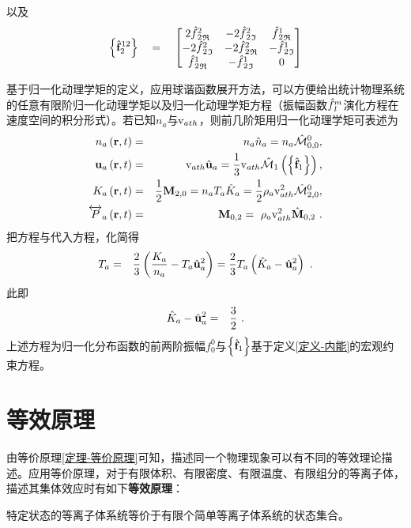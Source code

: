   以及
  \begin{equation}
      \left \{\hat{\mathbf{f}}_2^{12} \right \} \quad = \quad 
      \begin{bmatrix}
      2 {{\hat{f}}{_2^2}}_{\mathfrak{R}} & -2 {{\hat{f}}{_2^2}}_{\mathfrak{I}} & {{\hat{f}}{_2^1}}_{\mathfrak{R}} \\
      -2 {{\hat{f}}{_2^2}}_{\mathfrak{I}} & -2 {{\hat{f}}{_2^2}}_{\mathfrak{R}} & -{{\hat{f}}{_2^1}}_{\mathfrak{I}} \\
      {{\hat{f}}{_2^1}}_{\mathfrak{R}} & -{{\hat{f}}{_2^1}}_{\mathfrak{I}} & 0 \\
      \end{bmatrix} \label{fh212}
  \end{equation}
  
  基于归一化动理学矩的定义，应用球谐函数展开方法，可以方便给出统计物理系统的任意有限阶归一化动理学矩以及归一化动理学矩方程（振幅函数$\hat{f}{_{l}^m}$演化方程在速度空间的积分形式）。若已知$n_a$与$\mathrm{v}_{ath}$，则前几阶矩用归一化动理学矩可表述为
  \begin{eqnarray}
      n_a \left(\mathbf{r},t \right) &=& n_a \hat{n}_a = n_a \hat{\mathcal{M}}_{0,0}^0 ,  \label{naMh} 
      \\
      \mathbf{u}_a \left(\mathbf{r},t \right) &=& \mathrm{v}_{ath} \hat{\mathbf{u}}_a = \frac{1}{3}\mathrm{v}_{ath} \hat{\mathcal{M}}_1 \left(\left \{\hat{\mathbf{f}}_1 \right \} \right) ,  \label{uaMh} 
      \\
      K_a \left(\mathbf{r},t \right) &=& \frac{1}{2} \mathbf{M}_{2,0} = n_a T_a \hat{K}_a = \frac{1}{2} \rho_a \mathrm{v}_{ath}^2 \hat{\mathcal{M}}_{2,0}^0, \label{KaMh}
      \\
      \overleftrightarrow{P}_a \left(\mathbf{r},t \right) &=& \ \mathbf{M}_{0,2} =  \  \rho_a \mathrm{v}_{ath}^2 \hat{\mathbf{M}}_{0,2} ~. \label{PaIh}
  \end{eqnarray}
  把方程与代入方程，化简得
  \begin{eqnarray}
      T_a &=& \frac{2}{3} \left(\frac{K_a}{n_a} - T_a \hat{\mathbf{u}}_a^2 \right) = \frac{2}{3} T_a  \left(\hat{K}_a - \hat{\mathbf{u}}_a^2 \right)  ~. \label{TaMh}
  \end{eqnarray}
  此即
  \begin{eqnarray}
      \hat{K}_a - \hat{\mathbf{u}}_a^2  &=&  \frac{3}{2} ~. \label{Khauha}
  \end{eqnarray}
  上述方程为归一化分布函数的前两阶振幅$ f_0^0$与$\left \{\hat{\mathbf{f}}_1 \right \}$基于定义\ref{定义-内能}的宏观约束方程。
  

\section{等效原理}

  由等价原理\ref{定理-等价原理}可知，描述同一个物理现象可以有不同的等效理论描述。应用等价原理，对于有限体积、有限密度、有限温度、有限组分的等离子体，描述其集体效应时有如下\textbf{等效原理}：
\begin{theorem} \label{定理-等效原理}
    特定状态的等离子体系统等价于有限个简单等离子体系统的状态集合。
\end{theorem}

